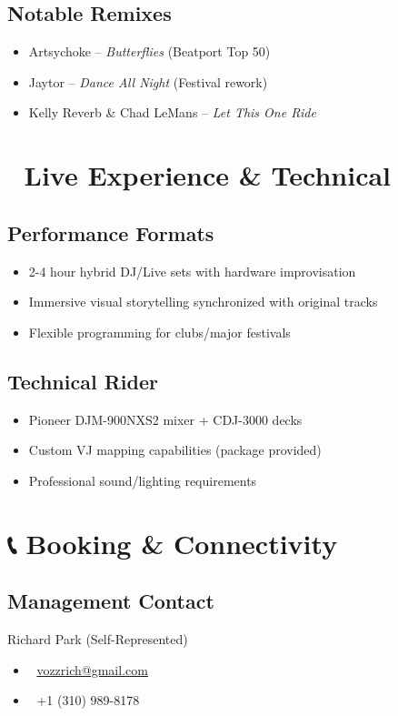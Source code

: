 \documentclass{article}
\begin{document}
\subsection*{Notable Remixes}  
\begin{itemize}  
\item Artsychoke – \textit{Butterflies} (Beatport Top 50)  
\item Jaytor – \textit{Dance All Night} (Festival rework)  
\item Kelly Reverb \& Chad LeMans – \textit{Let This One Ride}  
\end{itemize}  

\section*{🎪 Live Experience \& Technical}  
\subsection*{Performance Formats}  
\begin{itemize}  
\item 2-4 hour hybrid DJ/Live sets with hardware improvisation  
\item Immersive visual storytelling synchronized with original tracks  
\item Flexible programming for clubs/major festivals  
\end{itemize}  

\subsection*{Technical Rider}  
\begin{itemize}  
\item Pioneer DJM-900NXS2 mixer + CDJ-3000 decks  
\item Custom VJ mapping capabilities (package provided)  
\item Professional sound/lighting requirements  
\end{itemize}  

\section*{📞 Booking \& Connectivity}  
\subsection*{Management Contact}  
Richard Park (Self-Represented)  
\begin{itemize}  
\item 📧 \href{mailto:vozzrich@gmail.com}{vozzrich@gmail.com}  
\item 📱 +1 (310) 989-8178  
\end{itemize}  
\end{document}
